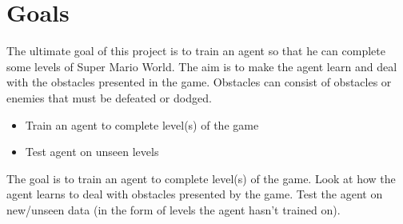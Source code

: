 \documentclass[11pt,a4paper]{article}
\begin{document}
\section{Goals}
The ultimate goal of this project is to train an agent so that he can complete some levels of Super Mario World.
The aim is to make the agent learn and deal with the obstacles presented in the game.
Obstacles can consist of obstacles or enemies that must be defeated or dodged.
\begin{itemize}
    \item Train an agent to complete level(s) of the game
    \item Test agent on unseen levels
\end{itemize}
The goal is to train an agent to complete level(s) of the game.
Look at how the agent learns to deal with obstacles presented by the game.
Test the agent on new/unseen data (in the form of levels the agent hasn't trained on).
\end{document}
